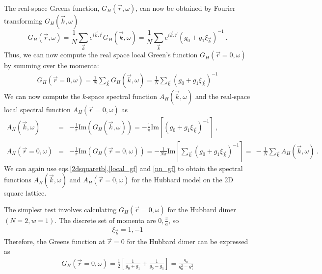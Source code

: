 \documentclass[12pt]{article}
\numberwithin{equation}{section}
\begin{document}
The real-space Greens function, $G_{H}(\vec{r},\omega)$, can now be obtained by Fourier transforming $G_H(\vec k, \omega)$ 
\begin{equation}
G_H(\vec r, \omega) = \frac{1}{N}\sum_{\vec k} e^{i\vec{k}.\vec{r}}G_H(\vec k, \omega) = \frac{1}{N}\sum_{\vec k}e^{i\vec{k}.\vec{r}}\left(g_0 + g_1 \xi_{\vec k}\right)^{-1}~.
\end{equation}
Thus, we can now compute the real space local Green's function $G_H(\vec r = 0, \omega)$ by summing over the momenta:
\begin{equation}\begin{aligned}
	G_H(\vec r = 0, \omega) = \frac{1}{N}\sum_{\vec k} G_H(\vec k, \omega) = \frac{1}{N}\sum_{\vec k}\left(g_0 + g_1 \xi_{\vec k}\right)^{-1}
\end{aligned}\end{equation}
We can now compute the $k$-space spectral function $A_{H}(\vec{k},\omega)$ and the real-space local spectral function $A_{H}(\vec{r}=0,\omega)$ as
\begin{eqnarray}
A_{H}(\vec{k},\omega) &=& -\frac{1}{\pi} \textrm{Im}(G_{H}(\vec{k},\omega)) = -\frac{1}{\pi} \textrm{Im}\left[ (g_{0} + g_{1}\xi_{\vec{k}})^{-1}\right]~,\nonumber\\
A_{H}(\vec{r}=0,\omega) &=& -\frac{1}{\pi} \textrm{Im}(G_{H}(\vec{r}=0,\omega)) = -\frac{1}{N\pi} \textrm{Im}\left[\sum_{\vec{k}} (g_{0} + g_{1}\xi_{\vec{k}})^{-1}\right] = ~-\frac{1}{N}\sum_{\vec{k}}A_{H}(\vec{k},\omega)~.
\end{eqnarray}
We can again use eqs.\eqref{2dsquaretb},\eqref{local_gf} and \eqref{nn_gf} to obtain the spectral functions  $A_{H} (\vec{k},\omega)$ and $A_{H} (\vec{r}=0,\omega)$ for the Hubbard model on the 2D square lattice.
\par\noindent
The simplest test involves calculating \(G_H(\vec r = 0, \omega)\) for the Hubbard dimer \(\left(N = 2, w = 1 \right)\). The discrete set of momenta are $0, \frac{\pi}{a}$, so
\begin{equation}\begin{aligned}
	\xi_{\vec k} = 1, -1
\end{aligned}\end{equation}
Therefore, the Greens function at $\vec r=0$ for the Hubbard dimer can be expressed as
\begin{equation}\begin{aligned}
	G_H(\vec r = 0, \omega) = \frac{1}{2}\left[\frac{1}{g_0 + g_1} + \frac{1}{g_0 - g_1}\right]  = \frac{g_0}{g_0^2 - g_1^2}
\end{aligned}\end{equation}
\end{document}
